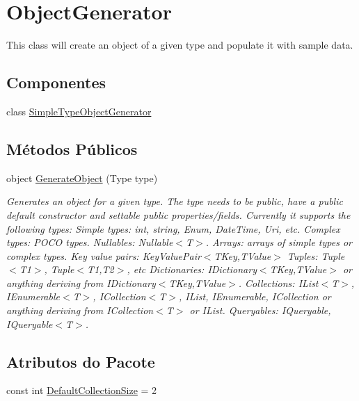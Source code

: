\hypertarget{classApi3Layers_1_1Areas_1_1HelpPage_1_1ObjectGenerator}{}\section{Object\+Generator}
\label{classApi3Layers_1_1Areas_1_1HelpPage_1_1ObjectGenerator}


This class will create an object of a given type and populate it with sample data.  


\subsection*{Componentes}
\begin{DoxyCompactItemize}
\item 
class \hyperlink{classApi3Layers_1_1Areas_1_1HelpPage_1_1ObjectGenerator_1_1SimpleTypeObjectGenerator}{Simple\+Type\+Object\+Generator}
\end{DoxyCompactItemize}
\subsection*{Métodos Públicos}
\begin{DoxyCompactItemize}
\item 
object \hyperlink{classApi3Layers_1_1Areas_1_1HelpPage_1_1ObjectGenerator_a5a661e03cac6c900f73a7e9e6e2d205d}{Generate\+Object} (Type type)
\begin{DoxyCompactList}\small\item\em Generates an object for a given type. The type needs to be public, have a public default constructor and settable public properties/fields. Currently it supports the following types\+: Simple types\+: int, string, Enum, Date\+Time, Uri, etc. Complex types\+: P\+O\+CO types. Nullables\+: Nullable$<$\+T$>$. Arrays\+: arrays of simple types or complex types. Key value pairs\+: Key\+Value\+Pair$<$\+T\+Key,\+T\+Value$>$ Tuples\+: Tuple$<$\+T1$>$, Tuple$<$\+T1,\+T2$>$, etc Dictionaries\+: I\+Dictionary$<$\+T\+Key,\+T\+Value$>$ or anything deriving from I\+Dictionary$<$\+T\+Key,\+T\+Value$>$. Collections\+: I\+List$<$\+T$>$, I\+Enumerable$<$\+T$>$, I\+Collection$<$\+T$>$, I\+List, I\+Enumerable, I\+Collection or anything deriving from I\+Collection$<$\+T$>$ or I\+List. Queryables\+: I\+Queryable, I\+Queryable$<$\+T$>$. \end{DoxyCompactList}\end{DoxyCompactItemize}
\subsection*{Atributos do Pacote}
\begin{DoxyCompactItemize}
\item 
const int \hyperlink{classApi3Layers_1_1Areas_1_1HelpPage_1_1ObjectGenerator_a3a0bf0ea42e20330508a59994b0d081c}{Default\+Collection\+Size} = 2
\end{DoxyCompactItemize}
